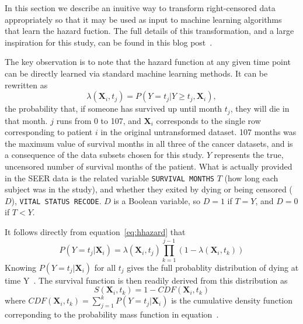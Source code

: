 \documentclass[10pt,letterpaper]{article}
\newcommand{\codewhite}[1]{\colorbox{white}{\texttt{#1}}}
\begin{document}
In this section we describe an inuitive way to transform right-censored data appropriately so that it may be used as input to machine learning algorithms that learn the hazard fuction. The full details of this transformation, and a large inspiration for this study, can be found in this blog post~\cite{kuhn}.


The key observation is to note that the hazard function at any given time point can be directly learned via standard machine learning methods. It can be rewritten as
\begin{equation}
\label{eq:hhazard}
\lambda(\mathbf{X}_{i}, t_{j}) = P(Y = t_{j}|Y \geq t_{j}, \mathbf{X}_{i}),
\end{equation}
the probability that, if someone has survived up until month $t_{j}$, they will die in that month.
 $j$ runs from 0 to 107, and $\mathbf{X}_{i}$ corresponds to the single row corresponding to patient $i$ in the original untransformed dataset.
107 months was the maximum value of survival months in all three of the cancer datasets, and is a consequence of the data subsets chosen for this study.
$Y$ represents the true, uncensored number of survival months of the patient.
What is actually provided in the SEER data is the related variable \codewhite{SURVIVAL MONTHS} $T$ (how long each subject was in the study), and whether they exited by dying or being censored ($D$), \codewhite{VITAL STATUS RECODE}. 
$D$ is a Boolean variable, so $D = 1$ if $T = Y$, and $D = 0$ if $T < Y$.



It follows directly from equation~\ref{eq:hhazard} that 
\begin{equation}
\label{eq:pmf}
P(Y = t_{j} | \mathbf{X}_{i}) = \lambda(\mathbf{X}_{i}, t_{j}) \prod_{k=1}^{j-1} (1 - \lambda(\mathbf{X}_{i}, t_{k}))
\end{equation}
Knowing $P(Y = t_{j} | \mathbf{X}_{i}) $ for all $t_{j}$ gives the 
full probablity distribution of dying at time Y~\cite{kuhn}.
The survival function is then readily derived from this distribution as
\begin{equation}
\label{eq:cdf}
S(\mathbf{X}_{i},t_{k}) = 1 - CDF(\mathbf{X}_{i}, t_{k})
\end{equation}
where $CDF(\mathbf{X}_{i}, t_{k}) = \sum_
{j=1}^{k} P(Y = t_{j} | \mathbf{X}_{i}) $ is the cumulative density function correponding to the probability mass function in equation~\cite{downey}.
\end{document}
